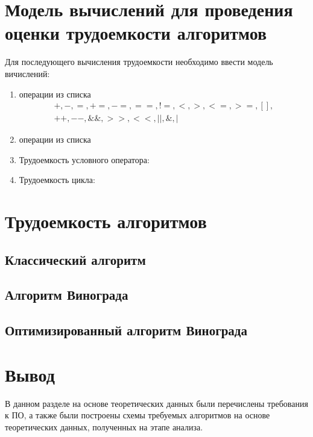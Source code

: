 \section{Модель вычислений для проведения оценки трудоемкости алгоритмов}
Для последующего вычисления трудоемкости необходимо ввести модель вичислений:

\begin{enumerate}
	\item операции из списка %
	\begin{equation}
		\label{eq:operations1}
		\begin{gathered}
			+, -, =, +=, -=, ==, !=, <, >, <=, >=, [], \\ ++, --, \&\&, >>, <<, ||, \&, |
		\end{gathered}
	\end{equation}
	\item операции из списка %
	\item Трудоемкость условного оператора:
	\item Трудоемкость цикла:
\end{enumerate}

\section{Трудоемкость алгоритмов}

\subsection*{Классический алгоритм}
\subsection*{Алгоритм Винограда}
\subsection*{Оптимизированный алгоритм Винограда}
	
\section*{Вывод}

В данном разделе на основе теоретических данных были перечислены требования к ПО, а также были построены схемы требуемых алгоритмов на основе теоретических данных, полученных на этапе анализа.